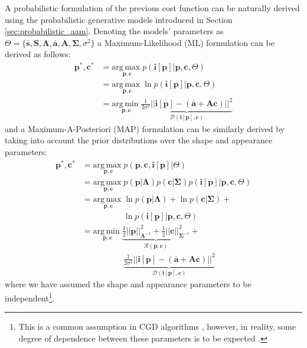 A probabilistic formulation of the previous cost function can be naturally derived using the probabilistic generative models introduced in Section \ref{sec:probabilistic_aam}. Denoting the models' parameters as \mbox{$\Theta = \{\mathbf{\bar{s}}, \mathbf{S}, \mathbf{\Lambda}, \mathbf{\bar{a}}, \mathbf{A}, \mathbf{\Sigma}, \sigma^2\}$} a Maximum-Likelihood (ML) formulation can be derived as follows:
\begin{equation}
    \begin{aligned}
        \mathbf{p}^*, \mathbf{c}^* & = \underset{\mathbf{p}, \mathbf{c}}{\mathrm{arg\,max\;}} p(\mathbf{i}[\mathbf{p}] |  \mathbf{p}, \mathbf{c}, \Theta) 
        \\
        & = \underset{\mathbf{p}, \mathbf{c}}{\mathrm{arg\,max\;}} \ln p(\mathbf{i}[\mathbf{p}] | \mathbf{p}, \mathbf{c}, \Theta)
        \\
        & = \underset{\mathbf{p}, \mathbf{c}}{\mathrm{arg\,min\;}} 
        \underbrace{ \frac{1}{2\sigma^2} || \mathbf{i}[\mathbf{p}] - (\mathbf{\bar{a}} + \mathbf{A} \mathbf{c}) ||^2}_{\mathcal{D}(\mathbf{i}[\mathbf{p}], \mathbf{c})} 
    \end{aligned}
    \label{eq:prob_ssd}
\end{equation}
and a Maximum-A-Posteriori (MAP) formulation can be similarly derived by taking into account the prior distributions over the shape and appearance parameters:
\begin{equation}
    \begin{aligned}
        \mathbf{p}^*, \mathbf{c}^* & = \underset{\mathbf{p}, \mathbf{c}}{\mathrm{arg\,max\;}} p(\mathbf{p}, \mathbf{c}, \mathbf{i}[\mathbf{p}] | \Theta) 
        \\
        & = \underset{\mathbf{p}, \mathbf{c}}{\mathrm{arg\,max\;}}  p(\mathbf{p} | \mathbf{\Lambda})  p(\mathbf{c} | \mathbf{\Sigma}) p(\mathbf{i}[\mathbf{p}] |
        \mathbf{p}, \mathbf{c}, \Theta)  
        \\
        & = \underset{\mathbf{p}, \mathbf{c}}{\mathrm{arg\,max\;}}  \ln p(\mathbf{p} | \mathbf{\Lambda}) + \ln p(\mathbf{c} | \mathbf{\Sigma}) +
        \\
        & \qquad \qquad \quad \ln p(\mathbf{i}[\mathbf{p}] | \mathbf{p}, \mathbf{c}, \Theta)
        \\
        & = \underset{\mathbf{p}, \mathbf{c}}{\mathrm{arg\,min\;}}  \underbrace{\frac{1}{2} ||\mathbf{p}||^2_{\mathbf{\Lambda}^{-1}} + \frac{1}{2}||\mathbf{c}||^2_{\mathbf{\Sigma}^{-1}}}_{\mathcal{R}(\mathbf{p}, \mathbf{c})} +
        \\
        & \qquad \qquad \quad \underbrace{ \frac{1}{2\sigma^2} || \mathbf{i}[\mathbf{p}] - (\mathbf{\bar{a}} + \mathbf{A} \mathbf{c}) ||^2}_{\mathcal{D}(\mathbf{i}[\mathbf{p}], \mathbf{c})} 
    \end{aligned}
    \label{eq:prob_rssd}
\end{equation}
where we have assumed the shape and appearance parameters to be independent\footnote{This is a common assumption in CGD algorithms \cite{Matthews2004}, however, in reality, some degree of dependence between these parameters is to be expected \cite{Cootes2001}.}.

